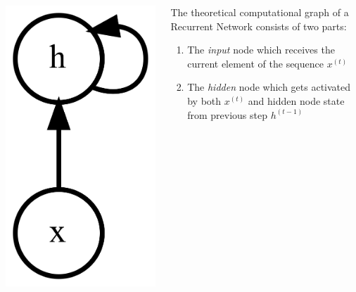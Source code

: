 \documentclass{beamer}
\begin{document}
\begin{frame}
\begin{columns}
\begin{column}{0.3\textwidth}
\begin{center}
        \includegraphics[height=0.6\textheight]{../img/rnn-comp-graph.png}
      \end{center}
    \end{column}
    \begin{column}{0.7\textwidth}
      The theoretical computational graph of a Recurrent Network consists of two parts:
      \begin{enumerate}
        \item The \textit{input} node which receives the current element of the sequence \(x^{(t)}\)
        \item The \textit{hidden} node which gets activated by both \(x^{(t)}\) and hidden node state from previous step \(h^{(t-1)}\)
      \end{enumerate}
    \end{column}
  \end{columns}
\end{frame}
\end{document}
